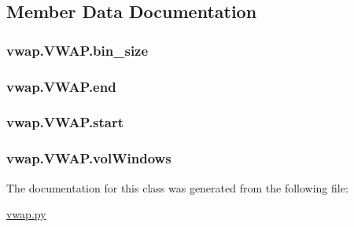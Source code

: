 \subsection{Member Data Documentation}
\hypertarget{classvwap_1_1_v_w_a_p_a3ad64e9b6c46c6c19d466fcaf7c7731b}{
\subsubsection[{bin\-\_\-size}]{\setlength{\rightskip}{0pt plus 5cm}vwap.\-V\-W\-A\-P.\-bin\-\_\-size}}\label{classvwap_1_1_v_w_a_p_a3ad64e9b6c46c6c19d466fcaf7c7731b}
\hypertarget{classvwap_1_1_v_w_a_p_ad2bbb53d53ae1d550c3cfce03374b34c}{
\subsubsection[{end}]{\setlength{\rightskip}{0pt plus 5cm}vwap.\-V\-W\-A\-P.\-end}}\label{classvwap_1_1_v_w_a_p_ad2bbb53d53ae1d550c3cfce03374b34c}
\hypertarget{classvwap_1_1_v_w_a_p_a338fff9c1c93f2d0434b76c5633b86e8}{
\subsubsection[{start}]{\setlength{\rightskip}{0pt plus 5cm}vwap.\-V\-W\-A\-P.\-start}}\label{classvwap_1_1_v_w_a_p_a338fff9c1c93f2d0434b76c5633b86e8}
\hypertarget{classvwap_1_1_v_w_a_p_a45fc3ac587b7e6dabcacc5661bf28b3e}{
\subsubsection[{vol\-Windows}]{\setlength{\rightskip}{0pt plus 5cm}vwap.\-V\-W\-A\-P.\-vol\-Windows}}\label{classvwap_1_1_v_w_a_p_a45fc3ac587b7e6dabcacc5661bf28b3e}


The documentation for this class was generated from the following file\-:\begin{DoxyCompactItemize}
\item 
\hyperlink{vwap_8py}{vwap.\-py}\end{DoxyCompactItemize}

